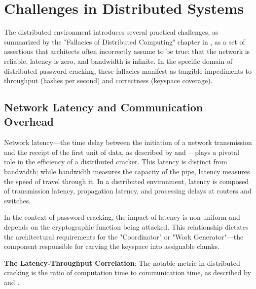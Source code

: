 \section{Challenges in Distributed Systems}

The distributed environment introduces several practical challenges, as summarized by the "Fallacies of Distributed Computing" chapter in \cite{distribution_challenges}, as a set of assertions that architects often incorrectly assume to be true: that the network is reliable, latency is zero, and bandwidth is infinite. In the specific domain of distributed password cracking, these fallacies manifest as tangible impediments to throughput (hashes per second) and correctness (keyspace coverage).

\subsection{Network Latency and Communication Overhead}
\label{net_lat_comm_ov}

Network latency—the time delay between the initiation of a network transmission and the receipt of the first unit of data, as described by \cite{distribution_challenges} and \cite{network_latency}—plays a pivotal role in the efficiency of a distributed cracker. This latency is distinct from bandwidth; while bandwidth measures the capacity of the pipe, latency measures the speed of travel through it. In a distributed environment, latency is composed of transmission latency, propagation latency, and processing delays at routers and switches.

In the context of password cracking, the impact of latency is non-uniform and depends on the cryptographic function being attacked. This relationship dictates the architectural requirements for the "Coordinator" or "Work Generator"—the component responsible for carving the keyspace into assignable chunks.

\textbf{The Latency-Throughput Correlation}: The notable metric in distributed cracking is the ratio of computation time to communication time, as described by \cite{distribution_challenges} and \cite{what_is_password_hashing}.

